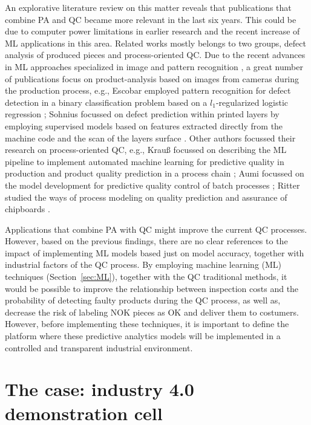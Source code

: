 \documentclass[5p,times,procedia]{elsarticle}
\begin{document}
An explorative literature review on this matter reveals that publications that combine PA and QC became more relevant in the last six years. This could be due to computer power limitations in earlier research and the recent increase of ML applications in this area. Related works mostly belongs to two groups, defect analysis of produced pieces and process-oriented QC.
Due to the recent advances in ML approaches specialized in image and pattern recognition \cite{bishop2006pattern}, a great number of publications focus on product-analysis based on images from cameras during the production process,
e.g., Escobar employed pattern recognition for defect detection in a binary classification problem based on a $l_1$-regularized logistic regression \cite{Carlos2018MLforQC}; Sohnius focussed on defect prediction within printed layers by employing supervised models based on features extracted directly from the machine code and the scan of the layers surface \cite{Sohnius2019PASurfacequality}.
Other authors focussed their research on process-oriented QC, e.g., 
Krauß focussed on describing the ML pipeline to implement automated machine learning for predictive quality in production \cite{krauss2020automated} and product quality prediction in a process chain \cite{krauss2019machine}; Aumi focussed on the model development for predictive quality control of batch processes \cite{aumi2012model}; Ritter studied the ways of process modeling on quality prediction and assurance of chipboards \cite{ritter1992neue}.

Applications that combine PA with QC might improve the current QC processes. However, based on the previous findings, there are no clear references to the impact of implementing ML models based just on model accuracy, together with industrial factors of the QC process. 
By employing machine learning (ML) techniques (Section~\ref{sec:ML}), together with the QC traditional methods, it would be possible to improve the relationship between inspection costs and the probability of detecting faulty products during the QC process, as well as, decrease the risk of labeling NOK pieces as OK and deliver them to costumers. However, before implementing these techniques, it is important to define the platform where these predictive analytics models will be implemented in a controlled and transparent industrial environment. 
  
\section{The case: industry 4.0 demonstration cell}  \label{sec:democell}%
\end{document}
